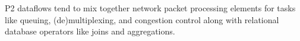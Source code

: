 \documentclass[twocolumn,10pt]{article}
\newcommand{\note}[1]{[\textcolor{red}{\textit{#1}}]}
\def\Sys{P2\xspace}
\begin{document}
\Sys dataflows tend to mix together network packet processing elements
for tasks like queuing, (de)multiplexing, and congestion control along
with relational database operators like joins and aggregations.

% 
% 


% 
% 
% 


% 
\end{document}
